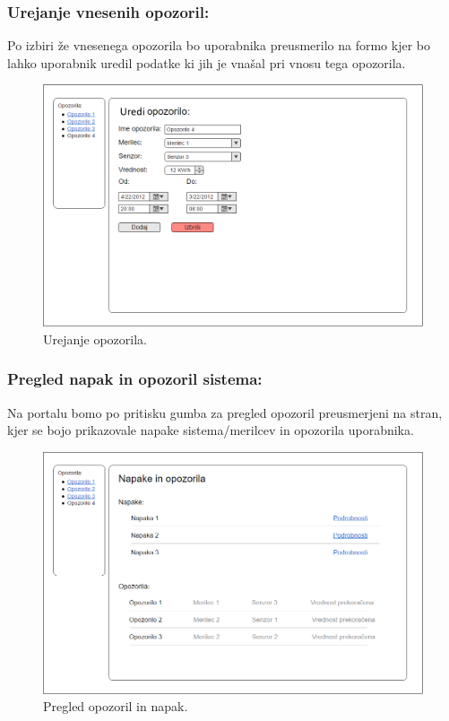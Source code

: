 \documentclass[12pt,a4paper,titlepage,openany]{report}
\begin{document}
\subsubsection{Urejanje vnesenih opozoril:}
Po izbiri že vnesenega opozorila bo uporabnika preusmerilo na formo kjer bo lahko uporabnik uredil podatke ki jih je vnašal pri vnosu tega opozorila.

\begin{figure}[H]
\begin{center}
\includegraphics[width=1\linewidth]{Slike/UrediOpozorilo.png}
\end{center}
\caption{Urejanje opozorila.}\label{slika:UrediOpozorilo}
\end{figure}

\subsubsection{Pregled napak in opozoril sistema:}
Na portalu bomo po pritisku gumba za pregled opozoril preusmerjeni na stran, kjer se bojo prikazovale napake sistema/merilcev in opozorila uporabnika. 

\begin{figure}[H]
\begin{center}
\includegraphics[width=1\linewidth]{Slike/PregledOpozorilInNapak.png}
\end{center}
\caption{Pregled opozoril in napak.}\label{slika:PregledOpozorilInNapak}
\end{figure}
\end{document}
